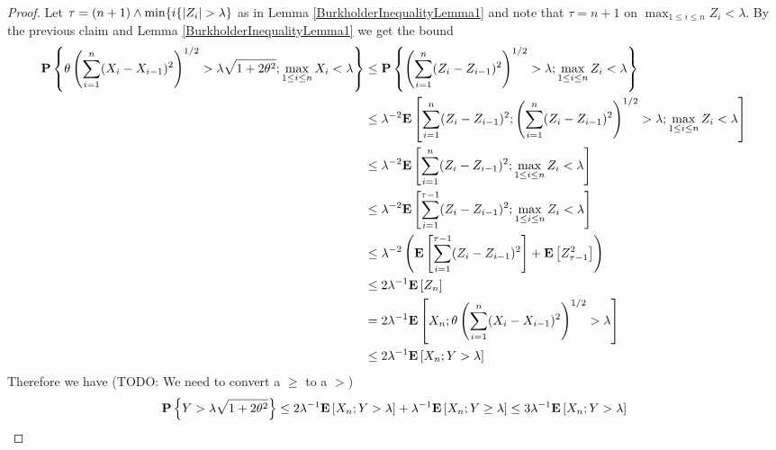\begin{proof}
Let $\tau = (n+1) \wedge \min \lbrace i \lbrace \left \vert Z_i \right \vert > \lambda \rbrace$ as in Lemma \ref{BurkholderInequalityLemma1} and note that $\tau = n+1$ on $\max_{1 \leq i \leq n} Z_i < \lambda$.
By the previous claim and Lemma \ref{BurkholderInequalityLemma1} we get the bound
\begin{align*}
\textbf{P}\left \{\theta \left( \sum_{i=1}^n (X_i-X_{i-1})^2 \right)^{1/2} > \lambda \sqrt{1+2\theta^2}; \max_{1 \leq i \leq  n} X_i < \lambda \right \} 
&\leq \textbf{P}\left \{ \left( \sum_{i=1}^n (Z_i - Z_{i-1})^2 \right)^{1/2} > \lambda ; \max_{1 \leq i \leq n} Z_i < \lambda \right \} \\
&\leq \lambda^{-2} \textbf{E}\left[\sum_{i=1}^n (Z_i - Z_{i-1})^2; \left( \sum_{i=1}^n (Z_i - Z_{i-1})^2 \right)^{1/2} > \lambda ; \max_{1 \leq i \leq n} Z_i < \lambda\right] \\
&\leq \lambda^{-2} \textbf{E}\left[\sum_{i=1}^n (Z_i - Z_{i-1})^2; \max_{1 \leq i \leq n} Z_i < \lambda\right] \\
&\leq \lambda^{-2} \textbf{E}\left[\sum_{i=1}^{\tau-1} (Z_i - Z_{i-1})^2; \max_{1 \leq i \leq n} Z_i < \lambda\right] \\
&\leq \lambda^{-2} \left( \textbf{E}\left[\sum_{i=1}^{\tau-1} (Z_i - Z_{i-1})^2\right] + \textbf{E}\left[Z_{\tau-1}^2\right] \right ) \\
&\leq 2 \lambda^{-1} \textbf{E}\left[Z_n\right] \\
&= 2 \lambda^{-1} \textbf{E}\left[X_n ; \theta \left( \sum_{i=1}^n (X_i-X_{i-1})^2 \right)^{1/2} > \lambda\right] \\
&\leq 2 \lambda^{-1} \textbf{E}\left[X_n; Y > \lambda\right]
\end{align*}
Therefore we have (TODO: We need to convert a $\geq$ to a $>$)
\begin{align*}
\textbf{P}\left \{Y > \lambda \sqrt{1+2\theta^2} \right \} 
&\leq 2 \lambda^{-1} \textbf{E}\left[X_n; Y > \lambda\right] + \lambda^{-1} \textbf{E}\left[X_n; Y \geq \lambda\right] 
\leq 3 \lambda^{-1} \textbf{E}\left[X_n; Y > \lambda\right] \\
\end{align*}


\end{proof}
